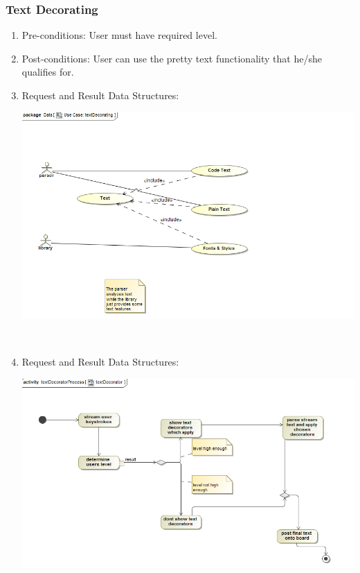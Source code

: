 \documentclass[hidelinks, 12pt, oneside]{article}
\begin{document}
\subsubsection{Text Decorating}
\begin{enumerate}
 \item Pre-conditions: User must have required level.

 
\item Post-conditions: User can use the pretty text functionality that he/she qualifies for. 

  
 \item Request and Result Data Structures:\\
  \centerline{\includegraphics[scale=0.4]{textDecorator}}\\
 \item Request and Result Data Structures:\\
  \centerline{\includegraphics[scale=0.4]{textDecoratorProcess}}\\

\end{enumerate}
\end{document}
